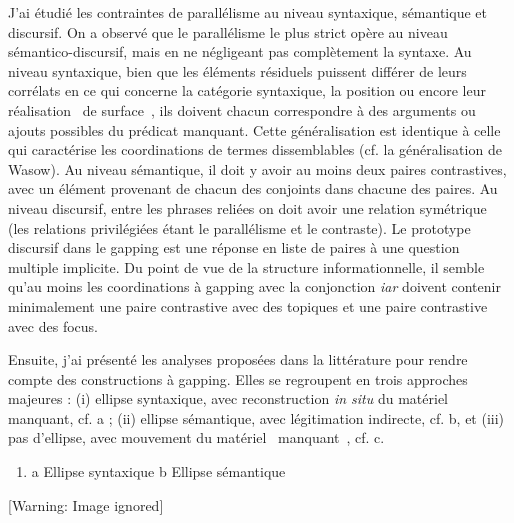 J'ai étudié les contraintes de parallélisme au niveau syntaxique, sémantique et discursif. On a observé que le parallélisme le plus strict opère au niveau sémantico-discursif, mais en ne négligeant pas complètement la syntaxe. Au niveau syntaxique, bien que les éléments résiduels puissent différer de leurs corrélats en ce qui concerne la catégorie syntaxique, la position ou encore leur réalisation {\guillemotleft}~de surface~{\guillemotright}, ils doivent chacun correspondre à des arguments ou ajouts possibles du prédicat manquant. Cette généralisation est identique à celle qui caractérise les coordinations de termes dissemblables (cf. la généralisation de Wasow). Au niveau sémantique, il doit y avoir au moins deux paires contrastives, avec un élément provenant de chacun des conjoints dans chacune des paires. Au niveau discursif, entre les phrases reliées on doit avoir une relation symétrique (les relations privilégiées étant le parallélisme et le contraste). Le prototype discursif dans le gapping est une réponse en liste de paires à une question multiple implicite. Du point de vue de la structure informationnelle, il semble qu'au moins les coordinations à gapping avec la conjonction \textit{iar} doivent contenir minimalement une paire contrastive avec des topiques et une paire contrastive avec des focus. 

Ensuite, j'ai présenté les analyses proposées dans la littérature pour rendre compte des constructions à gapping. Elles se regroupent en trois approches majeures : (i) ellipse syntaxique, avec reconstruction \textit{in situ} du matériel manquant, cf. a ; (ii) ellipse sémantique, avec légitimation indirecte, cf. b, et (iii) pas d'ellipse, avec mouvement du matériel {\guillemotleft}~manquant~{\guillemotright}, cf. c.


\begin{enumerate}
\item \label{bkm:Ref302414522}a  Ellipse syntaxique         b  Ellipse sémantique 


\end{enumerate}
    [Warning: Image ignored] %
 


\begin{table}
 [Warning: Image ignored] %


\caption{}
\end{table}

